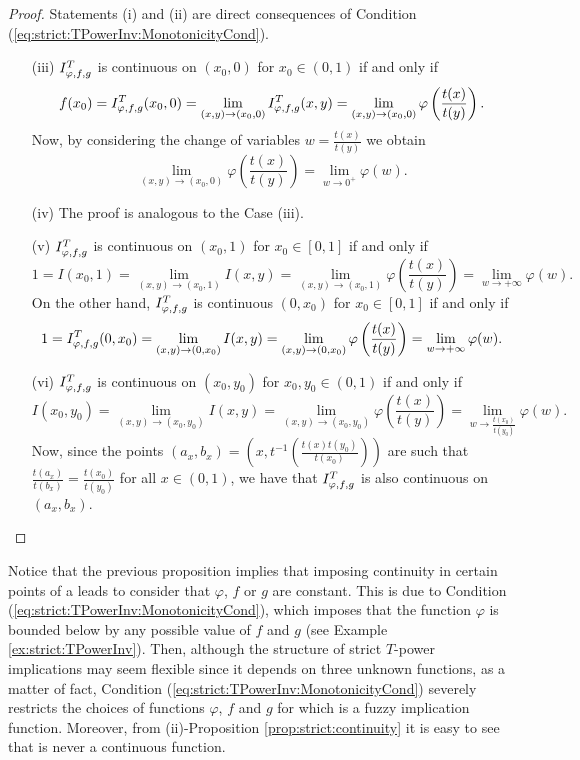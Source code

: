 \begin{proof}Statements (i) and (ii) are direct consequences of Condition (\ref{eq:strict:TPowerInv:MonotonicityCond}).
	\begin{enumerate}[label=(\roman*)]
		\item[(iii)] $I^T_{\varphi,f,g}$ is continuous on $(x_0,0)$ for $x_0 \in (0,1)$ if and only if
		$$f(x_0)=I^T_{\varphi,f,g}(x_0,0)=\lim_{(x,y) \to (x_0,0)}I^T_{\varphi,f,g}(x,y) = \lim_{(x,y) \to (x_0,0)} \varphi\left(\frac{t(x)}{t(y)}\right).$$
		Now, by considering the change of variables $w=\frac{t(x)}{t(y)}$ we obtain
		$$\lim_{(x,y) \to (x_0,0)} \varphi\left(\frac{t(x)}{t(y)}\right)=\lim_{w \to 0^+} \varphi(w).$$
		\item[(iv)] The proof is analogous to the Case (iii).
		\item[(v)] $I^T_{\varphi,f,g}$ is continuous on $(x_0,1)$ for $x_0 \in[0,1]$ if and only if
		$$1=I(x_0,1)=\lim_{(x,y) \to (x_0,1)}I(x,y)=\lim_{(x,y) \to (x_0,1)}\varphi\left(\frac{t(x)}{t(y)}\right)=\lim_{w \to +\infty}\varphi(w).$$ 
		On the other hand, $I^T_{\varphi,f,g}$ is continuous $(0,x_0)$ for $x_0 \in[0,1]$ if and only if
		$$1=I^T_{\varphi,f,g}(0,x_0)=\lim_{(x,y) \to (0,x_0)}I(x,y)=\lim_{(x,y) \to (0,x_0)}\varphi\left(\frac{t(x)}{t(y)}\right)=\lim_{w \to +\infty}\varphi(w).$$
		\item[(vi)] $I^T_{\varphi,f,g}$ is continuous on $(x_0,y_0)$ for $x_0,y_0 \in (0,1)$ if and only if
		$$I(x_0,y_0)=\lim_{(x,y) \to (x_0,y_0)} I(x,y)=\lim_{(x,y) \to (x_0,y_0)} \varphi \left(\frac{t(x)}{t(y)}\right) = \lim_{w \to \frac{t(x_0)}{t(y_0)}}\varphi(w).$$
		Now, since the points $(a_x,b_x)=\left(x,t^{-1}\left(\frac{t(x)t(y_0)}{t(x_0)}\right)\right)$ are such that $\frac{t(a_x)}{t(b_x)}=\frac{t(x_0)}{t(y_0)}$ for all $x \in (0,1)$, we have that $I^T_{\varphi,f,g}$ is also continuous on $(a_x,b_x)$. \qedhere
	\end{enumerate}
\end{proof}
Notice that the previous proposition implies that imposing continuity in certain points of a \STP leads to consider that $\varphi$, $f$ or $g$ are constant. This is due to Condition (\ref{eq:strict:TPowerInv:MonotonicityCond}), which imposes that the function $\varphi$ is bounded below by any possible value of $f$ and $g$ (see Example \ref{ex:strict:TPowerInv}). Then, although the structure of strict $T$-power implications may seem flexible since it depends on three unknown functions, as a matter of fact, Condition (\ref{eq:strict:TPowerInv:MonotonicityCond}) severely restricts the choices of functions $\varphi$, $f$ and $g$ for which \IT is a fuzzy implication function. Moreover, from (ii)-Proposition \ref{prop:strict:continuity} it is easy to see that \IT is never a continuous function.

